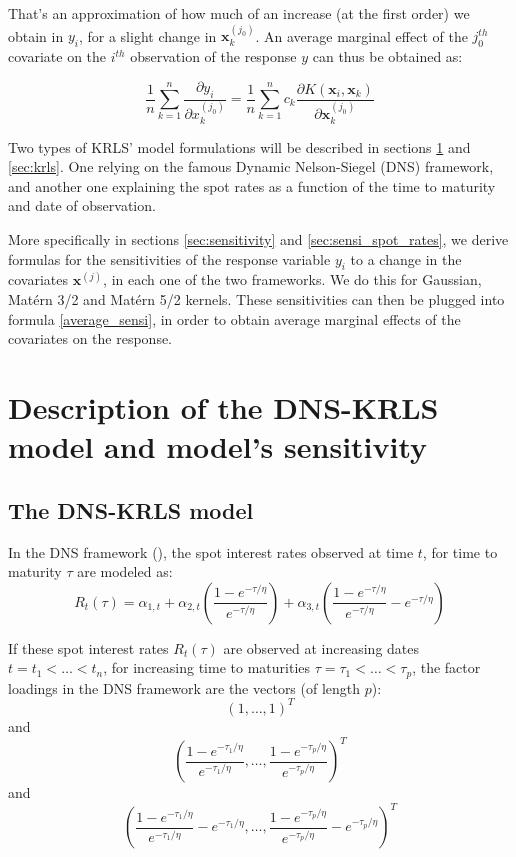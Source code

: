 \medskip

That's an approximation of how much of an increase (at the first order) we obtain in $y_i$,  for a slight change in $\textbf{x}_k^{(j_0)}$. An average marginal effect of the $j_0^{th}$ covariate on the $i^{th}$ observation of the response $y$ can thus be obtained as:

\begin{equation}
\label{average_sensi}
\frac{1}{n}\sum_{k = 1}^n \frac{\partial y_i}{\partial x_k^{(j_0)}} = \frac{1}{n}\sum_{k = 1}^n c_k \frac{\partial K(\textbf{x}_i, \textbf{x}_k)}{\partial \textbf{x}_k^{(j_0)}}
\end{equation}

Two types of KRLS' model formulations will be described in sections \ref{sec:dnskrls} and \ref{sec:krls}. One relying on the famous Dynamic Nelson-Siegel (DNS) framework, and another one explaining the spot rates as a function of the time to maturity and date of observation. 

More specifically in sections \ref{sec:sensitivity} and \ref{sec:sensi_spot_rates}, we derive formulas for the sensitivities of the response variable $y_i$ to a change in the covariates $\textbf{x}^{(j)}$, in each one of the two frameworks. We do this for Gaussian, Mat\'ern 3/2 and Mat\'ern 5/2 kernels. These sensitivities can then be plugged into formula \ref{average_sensi}, in order to obtain average marginal effects of the covariates on the response.

\section{Description of the DNS-KRLS model and model's sensitivity}
\label{sec:dnskrls}

\subsection{The DNS-KRLS model}

In the DNS framework (\cite{diebold2006forecasting}), the spot interest rates observed at time $t$, for time to maturity $\tau$ are modeled as:
\begin{equation}
R_t(\tau) = \alpha_{1, t} + \alpha_{2, t}\left(\frac{1-e^{-\tau/\eta}}{e^{-\tau/\eta}}\right) + \alpha_{3, t}\left(\frac{1-e^{-\tau/\eta}}{e^{-\tau/\eta}} - e^{-\tau/\eta}\right)
\end{equation}

\medskip

If these spot interest rates $R_t(\tau)$ are observed at increasing dates $t = t_1 < \ldots < t_n$, for increasing time to maturities $\tau = \tau_1 < \ldots < \tau_p$, the factor loadings in the DNS framework are the vectors (of length $p$):  
$$
(1, \ldots, 1)^T
$$
and
$$
\left(\frac{1-e^{-\tau_1/\eta}}{e^{-\tau_1/\eta}}, \ldots, \frac{1-e^{-\tau_p/\eta}}{e^{-\tau_p/\eta}}\right)^T
$$ 
and 
$$
\left(\frac{1-e^{-\tau_1/\eta}}{e^{-\tau_1/\eta}} - e^{-\tau_1/\eta}, \ldots, \frac{1-e^{-\tau_p/\eta}}{e^{-\tau_p/\eta}} - e^{-\tau_p/\eta}\right)^T
$$ 

